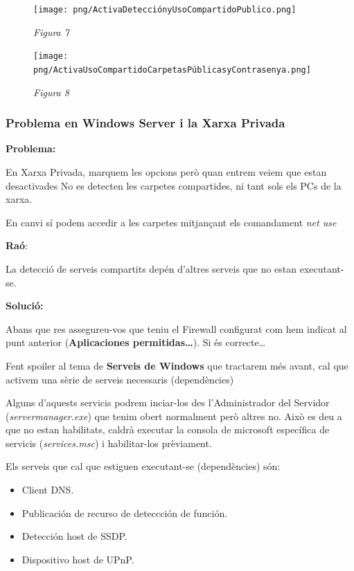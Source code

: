 \documentclass[
  a4paper,
]{article}
\providecommand{\tightlist}{%
  \setlength{\itemsep}{0pt}\setlength{\parskip}{0pt}}
\begin{document}
\begin{figure}
\centering
\texttt{[image: png/ActivaDetecciónyUsoCompartidoPublico.png]}
\caption{\emph{Figura 7}}
\end{figure}

\begin{figure}
\centering
\texttt{[image: png/ActivaUsoCompartidoCarpetasPúblicasyContrasenya.png]}
\caption{\emph{Figura 8}}
\end{figure}

\subsubsection{Problema en Windows Server i la Xarxa
Privada}\label{problema-en-windows-server-i-la-xarxa-privada}

\textbf{Problema:}

En Xarxa Privada, marquem les opcions però quan entrem veiem que estan
desactivades No es detecten les carpetes compartides, ni tant sols els
PCs de la xarxa.

En canvi sí podem accedir a les carpetes mitjançant els comandament
\emph{net use}

\textbf{Raó}:

La detecció de serveis compartits depén d'altres serveis que no estan
executant-se.

\textbf{Solució:}

Abans que res assegureu-vos que teniu el Firewall configurat com hem
indicat al punt anterior (\textbf{Aplicaciones permitidas\ldots{}}). Si
és correcte\ldots{}

Fent spoiler al tema de \textbf{Serveis de Windows} que tractarem més
avant, cal que activem una sèrie de serveis necessaris (dependències)

Alguns d'aquests servicis podrem inciar-los des l'Administrador del
Servidor (\emph{servermanager.exe}) que tenim obert normalment però
altres no. Això es deu a que no estan habilitats, caldrà executar la
consola de microsoft específica de servicis (\emph{services.msc}) i
habilitar-los prèviament.

Els serveis que cal que estiguen executant-se (dependències) són:

\begin{itemize}
\tightlist
\item
  Client DNS.
\item
  Publicación de recurso de deteccción de función.
\item
  Detección host de SSDP.
\item
  Dispositivo host de UPnP.
\end{itemize}
\end{document}
